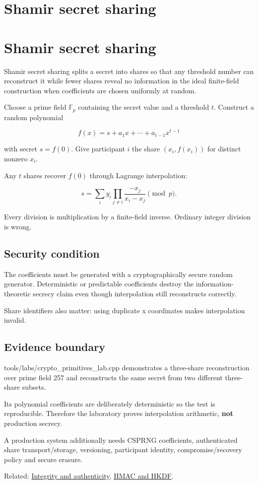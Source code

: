 \hypertarget{appendix-5888fd6102dc}{}
\section*{Shamir secret sharing}
\section{Shamir secret sharing}\label{appendix-5888fd6102dc-shamir-secret-sharing}

Shamir secret sharing splits a secret into shares so that any threshold number can reconstruct it while fewer shares reveal no information in the ideal finite-field construction when coefficients are chosen uniformly at random.

Choose a prime field \(\mathbb F_p\) containing the secret value and a threshold \(t\). Construct a random polynomial

\[
f(x)=s+a_1x+\cdots+a_{t-1}x^{t-1}
\]

with secret \(s=f(0)\). Give participant \(i\) the share \((x_i,f(x_i))\) for distinct nonzero \(x_i\).

Any \(t\) shares recover \(f(0)\) through Lagrange interpolation:

\[
s=
\sum_i y_i
\prod_{j\ne i}
\frac{-x_j}{x_i-x_j}
\pmod p.
\]

Every division is multiplication by a finite-field inverse. Ordinary integer division is wrong.

\subsection{Security condition}\label{appendix-5888fd6102dc-security-condition}

The coefficients must be generated with a cryptographically secure random generator. Deterministic or predictable coefficients destroy the information-theoretic secrecy claim even though interpolation still reconstructs correctly.

Share identifiers also matter: using duplicate x coordinates makes interpolation invalid.

\subsection{Evidence boundary}\label{appendix-5888fd6102dc-evidence-boundary}

tools/labs/crypto\_primitives\_lab.cpp demonstrates a three-share reconstruction over prime field 257 and reconstructs the same secret from two different three-share subsets.

Its polynomial coefficients are deliberately deterministic so the test is reproducible. Therefore the laboratory proves interpolation arithmetic, \textbf{not} production secrecy.

A production system additionally needs CSPRNG coefficients, authenticated share transport/storage, versioning, participant identity, compromise/recovery policy and secure erasure.

Related: \hyperref[appendix-cbe594d1ab0a]{Integrity and authenticity}, \hyperref[appendix-50af792c9da7]{HMAC and HKDF}.
